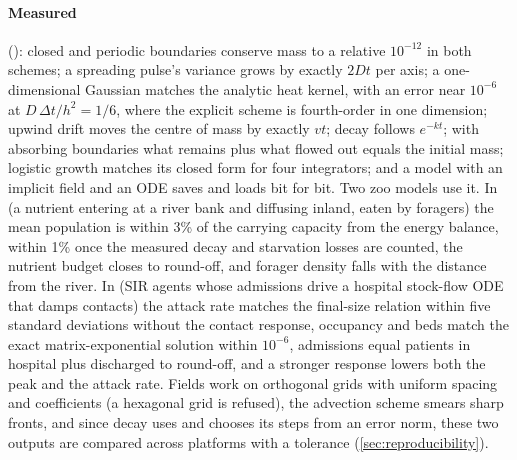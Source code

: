 \paragraph{Measured} (): closed and periodic boundaries conserve mass to a
relative $10^{-12}$ in both schemes; a spreading pulse's variance grows by exactly $2Dt$ per
axis; a one-dimensional Gaussian matches the analytic heat kernel, with an error near $10^{-6}$ at
$D\,\Delta t/h^2 = 1/6$, where the explicit scheme is fourth-order in one dimension; upwind drift moves the centre of mass
by exactly $vt$; decay follows $e^{-kt}$; with absorbing boundaries what remains plus what
flowed out equals the initial mass; logistic growth matches its closed form for four
integrators; and a model with an implicit field and an ODE saves and loads bit for bit. Two
zoo models use it. In  (a nutrient entering at a river bank and
diffusing inland, eaten by foragers) the mean population is within 3\% of the carrying
capacity from the energy balance, within 1\% once the measured decay and starvation losses
are counted, the nutrient budget closes to round-off, and forager density falls with the
distance from the river. In  (SIR agents whose admissions drive a
hospital stock-flow ODE that damps contacts) the attack rate matches the final-size relation
within five standard deviations without the contact response, occupancy and beds match the
exact matrix-exponential solution within $10^{-6}$, admissions equal patients in hospital plus
discharged to round-off, and a stronger response lowers both the peak and the attack rate.
Fields work on orthogonal grids with uniform spacing and coefficients (a hexagonal grid is
refused), the advection scheme smears sharp fronts, and since decay uses  and
 chooses its steps from an error norm, these two outputs are compared across
platforms with a tolerance (\cref{sec:reproducibility}).

